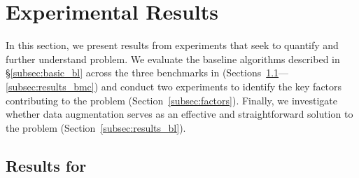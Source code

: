 \section{Experimental Results}
In this section, we present results from experiments that seek to quantify and further understand \pb problem. We evaluate the baseline algorithms described in \S\ref{subsec:basic_bl} across the three benchmarks in \bm (Sections~\ref{subsec:results_bma}---\ref{subsec:results_bmc}) and conduct two experiments to identify the key factors contributing to the \pb problem (Section~\ref{subsec:factors}). Finally, we investigate whether data augmentation serves as an effective and straightforward solution to the \pb problem (Section~\ref{subsec:results_bl}).


\subsection{Results for \bma{}}
\label{subsec:results_bma}



